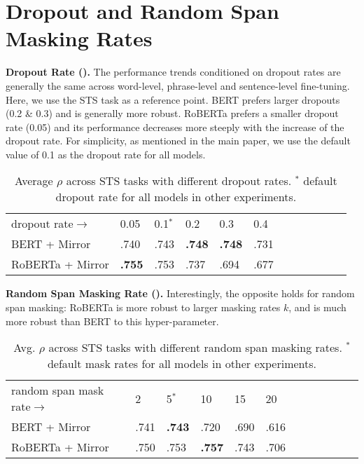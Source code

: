 \documentclass[11pt]{article}
\begin{document}
\section{Dropout and Random Span Masking Rates}

\noindent \textbf{Dropout Rate ().} The performance trends conditioned on dropout rates are generally the same across word-level, phrase-level and sentence-level fine-tuning. Here, we use the STS task as a reference point. BERT prefers larger dropouts (0.2 \& 0.3) and is generally more robust. RoBERTa prefers a smaller dropout rate (0.05) and its performance decreases more steeply with the increase of the dropout rate. For simplicity, as mentioned in the main paper, we use the default value of 0.1 as the dropout rate for all models.


\begin{table}[]
\centering
\setlength{\tabcolsep}{2.0pt}
\small
\begin{tabularx}{\linewidth}{lXXXXXXXXXXX}
\cmidrule[1.0pt]{1-10}
dropout rate$\rightarrow$ &  0.05 & 0.1$^\ast$ & 0.2 & 0.3 & 0.4\\
\cmidrule[1.0pt]{1-10}
BERT + Mirror & .740 & .743 & \textbf{.748} & \textbf{.748} & .731 \\
RoBERTa + Mirror & \textbf{.755} & .753 & .737 & .694 & .677 \\
\bottomrule
\end{tabularx}
\caption{Average $\rho$ across STS tasks with different dropout rates. $^\ast$ default dropout rate for all models in other experiments.}
\label{tab:dropout_rate}
\end{table}


\vspace{1.3mm}
\noindent \textbf{Random Span Masking Rate ().} Interestingly, the opposite holds for random span masking: RoBERTa is more robust to larger masking rates $k$, and is much more robust than BERT to this hyper-parameter.

\begin{table}[]
\centering
\setlength{\tabcolsep}{2.0pt}
\small
\begin{tabularx}{\linewidth}{lXXXXXXXXXXX}
\cmidrule[1.0pt]{1-10}
random span mask rate$\rightarrow$  & 2 & 5$^\ast$ & 10 & 15 & 20 \\
\cmidrule[1.0pt]{1-10}
BERT + Mirror & .741 & \textbf{.743} & .720 & .690 & .616 \\
RoBERTa + Mirror & .750 & .753 & \textbf{.757} & .743 & .706  \\
\bottomrule
\end{tabularx}
\caption{Avg. $\rho$ across STS tasks with different random span masking rates. $^\ast$ default mask rates for all models in other experiments.}
\label{tab:rm_rate}
\end{table}
\end{document}
